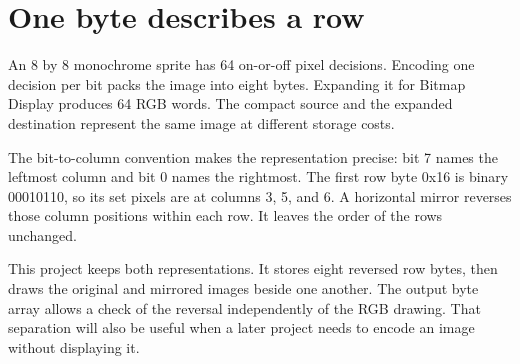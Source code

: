\section{One byte describes a
  row}\label{003-eight-byte-sprite-p00-one-byte-describes-a-row}

An 8 by 8 monochrome sprite has 64 on-or-off pixel decisions. Encoding
one decision per bit packs the image into eight bytes. Expanding it for
Bitmap Display produces 64 RGB words. The compact source and the
expanded destination represent the same image at different storage
costs.

The bit-to-column convention makes the representation precise: bit 7
names the leftmost column and bit 0 names the rightmost. The first row
byte 0x16 is binary 00010110, so its set pixels are at columns 3, 5, and
6. A horizontal mirror reverses those column positions within each row.
It leaves the order of the rows unchanged.

This project keeps both representations. It stores eight reversed row
bytes, then draws the original and mirrored images beside one another.
The output byte array allows a check of the reversal independently of
the RGB drawing. That separation will also be useful when a later
project needs to encode an image without displaying it.
